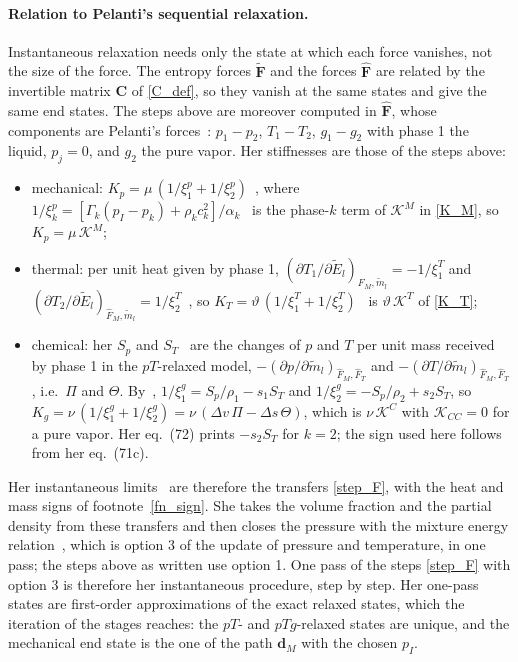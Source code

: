\paragraph{Relation to Pelanti's sequential relaxation.}
Instantaneous relaxation needs only the state at which each force vanishes, not the size of the force. The entropy forces $\tilde{\boldsymbol{F}}$ and the forces $\hat{\boldsymbol{F}}$ are related by the invertible matrix $\boldsymbol{C}$ of \eqref{C_def}, so they vanish at the same states and give the same end states. The steps above are moreover computed in $\hat{\boldsymbol{F}}$, whose components are Pelanti's forces~\cite{Pelanti2022}: $p_1-p_2$, $T_1-T_2$, $g_1-g_2$ with phase 1 the liquid, $p_{j}=0$, and $g_2$ the pure vapor. Her stiffnesses are those of the steps above:
\begin{itemize}
\item mechanical: $K_p=\mu\,(1/\xi_1^p+1/\xi_2^p)$~\cite[eq.~(55)]{Pelanti2022}, where $1/\xi_k^p=[\Gamma_k(p_I-p_k)+\rho_kc_k^2]/\alpha_k$~\cite[eq.~(51)]{Pelanti2022} is the phase-$k$ term of $\mathcal{K}^M$ in \eqref{K_M}, so $K_p=\mu\,\mathcal{K}^M$;
\item thermal: per unit heat given by phase 1, $(\partial T_1/\partial\tilde{E}_l)_{\hat{F}_M,\tilde{m}_l}=-1/\xi_1^T$ and $(\partial T_2/\partial\tilde{E}_l)_{\hat{F}_M,\tilde{m}_l}=1/\xi_2^T$~\cite[eqs.~(62), (63)]{Pelanti2022}, so $K_T=\vartheta\,(1/\xi_1^T+1/\xi_2^T)$~\cite[eq.~(66)]{Pelanti2022} is $\vartheta\,\mathcal{K}^T$ of \eqref{K_T};
\item chemical: her $S_p$ and $S_T$~\cite[eq.~(23)]{Pelanti2022} are the changes of $p$ and $T$ per unit mass received by phase 1 in the $pT$-relaxed model, $-(\partial p/\partial\tilde{m}_l)_{\hat{F}_M,\hat{F}_T}$ and $-(\partial T/\partial\tilde{m}_l)_{\hat{F}_M,\hat{F}_T}$, i.e.\ $\Pi$ and $\Theta$. By~\cite[eqs.~(71b), (71c), (73)]{Pelanti2022}, $1/\xi_1^g=S_p/\rho_1-s_1S_T$ and $1/\xi_2^g=-S_p/\rho_2+s_2S_T$, so $K_g=\nu\,(1/\xi_1^g+1/\xi_2^g)=\nu\,(\Delta v\,\Pi-\Delta s\,\Theta)$, which is $\nu\,\mathcal{K}^C$ with $\mathcal{K}_{CC}=0$ for a pure vapor. Her eq.~(72) prints $-s_2S_T$ for $k=2$; the sign used here follows from her eq.~(71c).
\end{itemize}
Her instantaneous limits~\cite[eqs.~(57), (68), (79), (80)]{Pelanti2022} are therefore the transfers \eqref{step_F}, with the heat and mass signs of footnote~\ref{fn_sign}. She takes the volume fraction and the partial density from these transfers and then closes the pressure with the mixture energy relation~\cite[eqs.~(59), (70), (82)]{Pelanti2022}, which is option 3 of the update of pressure and temperature, in one pass; the steps above as written use option 1. One pass of the steps \eqref{step_F} with option 3 is therefore her instantaneous procedure, step by step. Her one-pass states are first-order approximations of the exact relaxed states, which the iteration of the stages reaches: the $pT$- and $pTg$-relaxed states are unique, and the mechanical end state is the one of the path $\boldsymbol{d}_M$ with the chosen $p_I$.

